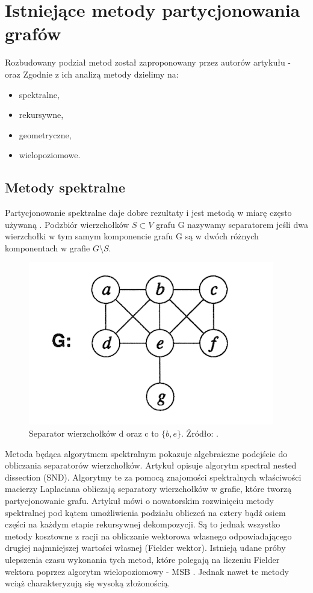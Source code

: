 \newpage


\section{Istniejące metody partycjonowania grafów}
\label{sec:literature}

Rozbudowany podział metod został zaproponowany przez autorów artykułu - \cite{metis}
oraz \cite{1364754}
Zgodnie z ich analizą metody dzielimy na:
\begin{itemize}
    \item spektralne,
    \item rekursywne,
    \item geometryczne,
    \item wielopoziomowe.
\end{itemize}

\subsection{Metody spektralne}
Partycjonowanie spektralne daje dobre rezultaty i jest metodą w miarę często używaną
\cite{10.1137/0611030, 10.5555/147877.147902, improved_spectral}.
Podzbiór wierzchołków \(S \subset V\) grafu G nazywamy separatorem jeśli dwa wierzchołki w tym samym komponencie
grafu G są w dwóch różnych komponentach w grafie  \(G \setminus S\).

\begin{figure}[h]
    \centering
    \includegraphics[width=0.3\linewidth]{images/separator}
    \caption{Separator wierzchołków d oraz c to \(\{b, e\}\).
    Źródło: \cite{MiTeThVa93}.}
    \label{im:separator}
\end{figure}

Metoda \cite{10.1137/0611030} będąca algorytmem spektralnym pokazuje algebraiczne podejście do obliczania
separatorów wierzchołków.
Artykuł \cite{10.5555/147877.147902} opisuje algorytm spectral nested dissection (SND).
Algorytmy te za pomocą znajomości spektralnych właściwości macierzy Laplaciana obliczają separatory wierzchołków w grafie,
które tworzą partycjonowanie grafu.
Artykuł \cite{improved_spectral} mówi o nowatorskim rozwinięciu metody spektralnej pod kątem umożliwienia podziału
obliczeń na cztery bądź osiem części na każdym etapie rekursywnej dekompozycji.
Są to jednak wszystko metody kosztowne z racji na
obliczanie wektorowa własnego odpowiadającego drugiej najmniejszej wartości własnej (Fielder wektor).
Istnieją udane próby ulepszenia czasu wykonania tych metod, które polegają na liczeniu Fielder wektora poprzez
algorytm wielopoziomowy - MSB \cite{fast_multilevel}. Jednak nawet te metody wciąż charakteryzują się wysoką złożonością.



